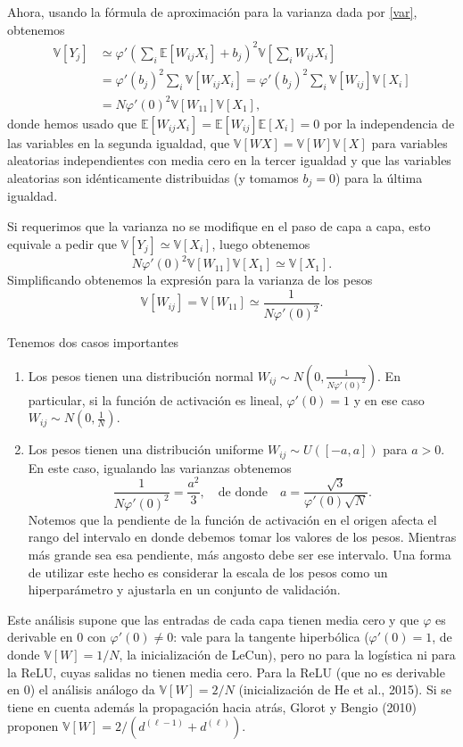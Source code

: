 \documentclass[12pt, a4paper]{amsbook}
\newcommand{\E}{{\mathbb E}}
\newcommand{\V}{{\mathbb V}}
\theoremstyle{remark}
\theoremstyle{definition}
\numberwithin{section}{chapter}
\numberwithin{subsection}{section}
\numberwithin{equation}{section}
\numberwithin{figure}{chapter}
\begin{document}
Ahora, usando la fórmula de aproximación para la varianza dada por \eqref{var}, obtenemos
\begin{align*}
\V[Y_j] &\simeq \varphi'\left(\sum_i \E[W_{ij} X_i] + b_j\right)^2 \V\left[\sum_i W_{ij} X_i\right]\\
&= \varphi'(b_j)^2 \sum_i \V[W_{ij}X_i] = \varphi'(b_j)^2 \sum_i \V[W_{ij}] \V[X_i]\\
&= N\varphi'(0)^2 \V[W_{11}] \V[X_1],
\end{align*}
donde hemos usado que $\E[W_{ij}X_i] = \E[W_{ij}]\E[X_i] = 0$ por la independencia de las variables en la segunda igualdad, que $\V[WX] = \V[W]\V[X]$ para variables aleatorias independientes con media cero en la tercer igualdad y que las variables aleatorias son idénticamente distribuidas (y tomamos $b_j=0$) para la última igualdad.

Si requerimos que la varianza no se modifique en el paso de capa a capa, esto equivale a pedir que $\V[Y_j] \simeq \V[X_i]$, luego obtenemos
$$
N\varphi'(0)^2 \V[W_{11}] \V[X_1] \simeq \V[X_1].
$$
Simplificando obtenemos la expresión para la varianza de los pesos
$$
\V[W_{ij}] = \V[W_{11}] \simeq \frac{1}{N\varphi'(0)^2}.
$$

Tenemos dos casos importantes
\begin{enumerate}
\item Los pesos tienen una distribución normal $W_{ij}\sim N(0,\tfrac{1}{N\varphi'(0)^2})$. En particular, si la función de activación es lineal, $\varphi'(0)=1$ y en ese caso $W_{ij}\sim N(0,\tfrac{1}{N})$.

\item Los pesos tienen una distribución uniforme $W_{ij}\sim U([-a,a])$ para $a>0$. En este caso, igualando las varianzas obtenemos
$$
\frac{1}{N\varphi'(0)^2} = \frac{a^2}{3}, \quad \text{de donde}\quad a=\frac{\sqrt 3}{\varphi'(0)\sqrt{N}}.
$$
Notemos que la pendiente de la función de activación en el origen afecta el rango del intervalo en donde debemos tomar los valores de los pesos. Mientras más grande sea esa pendiente, más angosto debe ser ese intervalo. Una forma de utilizar este hecho es considerar la escala de los pesos como un hiperparámetro y ajustarla en un conjunto de validación.
\end{enumerate}

Este análisis supone que las entradas de cada capa tienen media cero y que $\varphi$ es derivable en $0$ con $\varphi'(0)\ne0$: vale para la tangente hiperbólica ($\varphi'(0)=1$, de donde $\V[W]=1/N$, la inicialización de LeCun), pero no para la logística ni para la ReLU, cuyas salidas no tienen media cero. Para la ReLU (que no es derivable en $0$) el análisis análogo da $\V[W]=2/N$ (inicialización de He et al., 2015). Si se tiene en cuenta además la propagación hacia atrás, Glorot y Bengio (2010) proponen $\V[W]=2/(d^{(\ell-1)}+d^{(\ell)})$.
\end{document}

